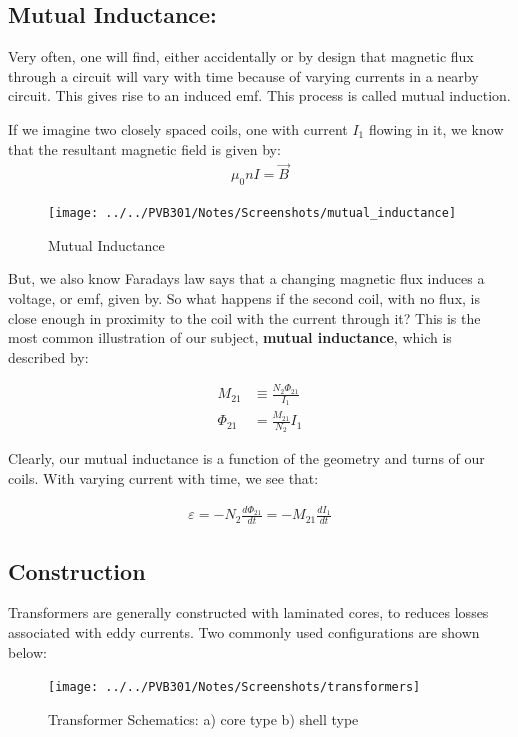 \documentclass{book}
\begin{document}
\subsection{Mutual Inductance:}

Very often, one will find, either accidentally or by design that magnetic flux through a circuit will vary with time because of varying currents in a nearby circuit. This gives rise to an induced emf. This process is called mutual induction. 

If we imagine two closely spaced coils, one with current $I_1$ flowing in it, we know that the resultant magnetic field is given by:
\begin{align*}
	\mu_0 n I = \vec{B}
\end{align*}
\begin{figure}[h]
	\centering
	\texttt{[image: ../../PVB301/Notes/Screenshots/mutual\_inductance]}
	\caption{Mutual Inductance}
	\label{fig:mutualinductance}
\end{figure}

But, we also know Faradays law says that a changing magnetic flux induces a voltage, or emf, given by. So what happens if the second coil, with no flux, is close enough in proximity to the coil with the current through it? This is the most common illustration of our subject, \textbf{mutual inductance}, which is described by:

\begin{align*}
	M_{21} &\equiv \frac{N_2 \Phi_{21}}{I_1} \\
	\Phi_{21} &= \frac{M_{21}}{N_2}I_1
\end{align*}

Clearly, our mutual inductance is a function of the geometry and turns of our coils. With varying current with time, we see that:

\begin{align*}
	\varepsilon = -N_2 \frac{d \Phi_{21}}{dt} = -M_{21} \frac{dI_1}{dt}
\end{align*}


\subsection{Construction}

Transformers are generally constructed with laminated cores, to reduces losses associated with eddy currents. Two commonly used configurations are shown below:
\begin{figure}[h]
	\centering
	\texttt{[image: ../../PVB301/Notes/Screenshots/transformers]}
	\caption{Transformer Schematics: a) core type b) shell type}
	\label{fig:transformers}
\end{figure}
\end{document}
